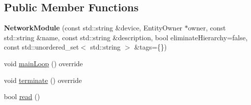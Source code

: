 \subsection*{Public Member Functions}
\begin{DoxyCompactItemize}
\item 
{\bfseries Network\+Module} (const std\+::string \&device, Entity\+Owner $\ast$owner, const std\+::string \&name, const std\+::string \&description, bool eliminate\+Hierarchy=false, const std\+::unordered\+\_\+set$<$ std\+::string $>$ \&tags=\{\})\hypertarget{structNetworkModule_a3d47f6f84c9f3a67b2583b2025df5be6}{}\label{structNetworkModule_a3d47f6f84c9f3a67b2583b2025df5be6}

\item 
void \hyperlink{structNetworkModule_af06fc227b558a13184bd0c3b168d7102}{main\+Loop} () override
\item 
void \hyperlink{structNetworkModule_a593e66b34e1f3bdc5180aee6ae5c90b8}{terminate} () override
\item 
bool \hyperlink{structNetworkModule_a16f323f8ccfa306d1e0213179b9e0aae}{read} ()
\end{DoxyCompactItemize}

